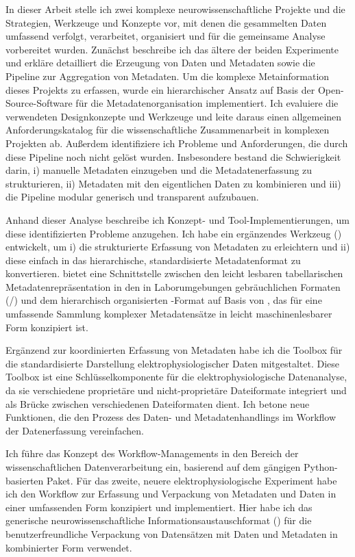 In dieser Arbeit stelle ich zwei komplexe neurowissenschaftliche Projekte und die Strategien, Werkzeuge und Konzepte vor, mit denen die gesammelten Daten umfassend verfolgt, verarbeitet, organisiert und für die gemeinsame Analyse vorbereitet wurden. Zunächst beschreibe ich das ältere der beiden Experimente und erkläre detailliert die Erzeugung von Daten und Metadaten sowie die Pipeline zur Aggregation von Metadaten. Um die komplexe Metainformation dieses Projekts zu erfassen, wurde ein hierarchischer Ansatz auf Basis der Open-Source-Software  für die Metadatenorganisation implementiert. Ich evaluiere die verwendeten Designkonzepte und Werkzeuge und leite daraus einen allgemeinen Anforderungskatalog für die wissenschaftliche Zusammenarbeit in komplexen Projekten ab. Außerdem identifiziere ich Probleme und Anforderungen, die durch diese Pipeline noch nicht gelöst wurden. Insbesondere bestand die Schwierigkeit darin, i) manuelle Metadaten einzugeben und die Metadatenerfassung zu strukturieren, ii) Metadaten mit den eigentlichen Daten zu kombinieren und iii) die Pipeline modular generisch und transparent aufzubauen. 

Anhand dieser Analyse beschreibe ich Konzept- und Tool-Implementierungen, um diese identifizierten Probleme anzugehen. Ich habe ein ergänzendes Werkzeug () entwickelt, um i) die strukturierte Erfassung von Metadaten zu erleichtern und ii) diese einfach in das hierarchische, standardisierte Metadatenformat  zu konvertieren.  bietet eine Schnittstelle zwischen den leicht lesbaren tabellarischen Metadatenrepräsentation in den in Laborumgebungen gebräuchlichen Formaten (/) und dem hierarchisch organisierten -Format auf Basis von , das für eine umfassende Sammlung komplexer Metadatensätze in leicht maschinenlesbarer Form konzipiert ist.

Ergänzend zur koordinierten Erfassung von Metadaten habe ich die  Toolbox für die standardisierte Darstellung elektrophysiologischer Daten mitgestaltet. Diese Toolbox ist eine Schlüsselkomponente für die elektrophysiologische Datenanalyse, da sie verschiedene proprietäre und nicht-proprietäre Dateiformate integriert und als Brücke zwischen verschiedenen Dateiformaten dient. Ich betone neue Funktionen, die den Prozess des Daten- und Metadatenhandlings im Workflow der Datenerfassung vereinfachen.

Ich führe das Konzept des Workflow-Managements in den Bereich der wissenschaftlichen Datenverarbeitung ein, basierend auf dem gängigen Python-basierten  Paket. Für das zweite, neuere elektrophysiologische Experiment habe ich den Workflow zur Erfassung und Verpackung von Metadaten und Daten in einer umfassenden Form konzipiert und implementiert. Hier habe ich das generische neurowissenschaftliche Informationsaustauschformat () für die benutzerfreundliche Verpackung von Datensätzen mit Daten und Metadaten in kombinierter Form verwendet.

